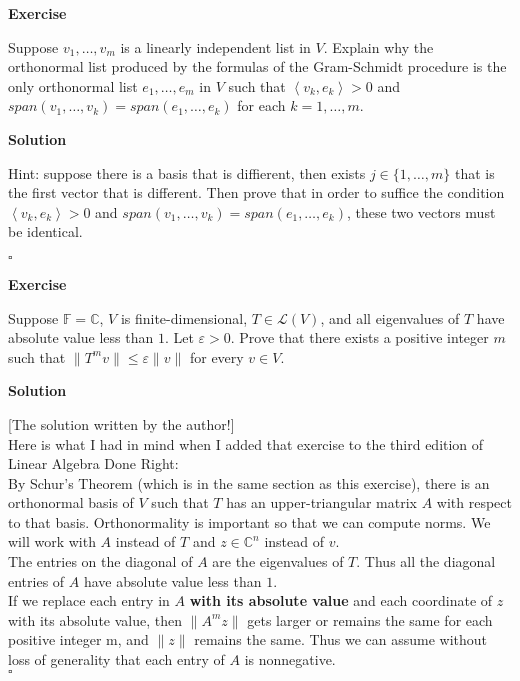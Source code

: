 \documentclass{article}
\newenvironment{exercise}{%
{\textbf{Exercise\\}
    }
}{
}
\newenvironment{solution}{%
{
    \textbf{Solution\\}
    }
}{
  \hfill $\square$ 
  \par\bigskip 
}
\newcommand{\CC}{\mathbb{C}}
\newcommand{\FF}{\mathbb{F}}
\begin{document}
\begin{CJK}{UTF8}{gkai}
\begin{exercise}
    Suppose $v_1,\ldots,v_m$ is a linearly independent list in $V$. Explain why the orthonormal list produced by the formulas of the Gram-Schmidt procedure is the only orthonormal list $e_1,\ldots,e_m$ in $V$ such that $\left<v_k,e_k\right> > 0$ and $span(v_1,\ldots,v_k) = span(e_1,\ldots,e_k)$ for each $k = 1,\ldots,m$.
\end{exercise}

\begin{solution}
    Hint: suppose there is a basis that is diffierent, then exists $j \in \{1,\ldots,m\}$ that is the first vector that is different. Then prove that in order to suffice the condition $\left<v_k,e_k\right> > 0$ and $span(v_1,\ldots,v_k) = span(e_1,\ldots,e_k)$, these two vectors must be identical. 
\end{solution}

\begin{exercise}
    Suppose $\FF = \CC$, $V$ is finite-dimensional, $T \in \mathcal{L}(V)$, and all eigenvalues of $T$ have absolute value less than $1$. Let $\varepsilon > 0$. Prove that there exists a positive integer $m$ such that $\|T^m v\| \leq \varepsilon\|v\|$ for every $v \in V$.   
\end{exercise} 
    
\begin{solution}
    [The solution written by the author!]\\

    Here is what I had in mind when I added that exercise to the third edition of Linear Algebra Done Right:\\

    By Schur's Theorem (which is in the same section as this exercise), there is an orthonormal basis of $V$ such that $T$ has an upper-triangular matrix $A$ with respect to that basis. Orthonormality is important so that we can compute norms. We will work with $A$ instead of $T$ and $z\in \CC^n$ instead of $v$.\\
    
    The entries on the diagonal of $A$ are the eigenvalues of $T$. Thus all the diagonal entries of $A$ have absolute value less than $1$.\\
    
    If we replace each entry in $A$ \textbf{with its absolute value} and each coordinate of $z$ with its absolute value, then $\|A^m z\|$ gets larger or remains the same for each positive integer m, and $\|z\|$ remains the same. Thus we can assume without loss of generality that each entry of $A$ is nonnegative.\\
    

\end{solution}
\end{CJK}
\end{document}
